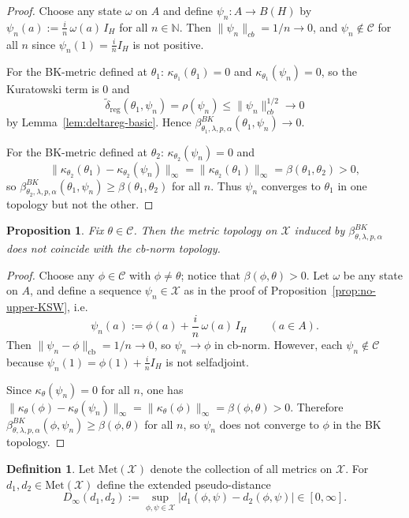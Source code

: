\documentclass[11pt]{amsart}
\newtheorem{proposition}[theorem]{Proposition}
\theoremstyle{definition}
\newtheorem{definition}[theorem]{Definition}
\theoremstyle{remark}
\newcommand{\N}{\mathbb N}
\newcommand{\1}{\mathbbm{1}}
\newcommand{\cb}{\mathrm{cb}}
\begin{document}
\begin{proof}
Choose any state $\omega$ on $A$ and define $\psi_n:A\to B(H)$ by
$\psi_n(a):=\frac{i}{n}\,\omega(a)\,I_H$ for all $n\in\N$.
Then $\|\psi_n\|_{cb}=1/n\to 0$, and $\psi_n\notin \mathcal C$ for all $n$ since $\psi_n(1)=\frac{i}{n}I_H$ is not positive.

For the BK-metric defined at $\theta_1$:
$\kappa_{\theta_1}(\theta_1)=0$ and $\kappa_{\theta_1}(\psi_n)=0$, so the Kuratowski term is $0$ and
\[
\widetilde\delta_{\mathrm{reg}}(\theta_1,\psi_n)=\rho(\psi_n)\le \|\psi_n\|_{cb}^{1/2}\to 0
\]
by Lemma~\ref{lem:deltareg-basic}. Hence $\beta^{BK}_{\theta_1,\lambda,p,\alpha}(\theta_1,\psi_n)\to 0$.

For the BK-metric defined at $\theta_2$:
$\kappa_{\theta_2}(\psi_n)=0$ and
\[
\|\kappa_{\theta_2}(\theta_1)-\kappa_{\theta_2}(\psi_n)\|_\infty=\|\kappa_{\theta_2}(\theta_1)\|_\infty=\beta(\theta_1,\theta_2)>0,
\]
so $\beta^{BK}_{\theta_2,\lambda,p,\alpha}(\theta_1,\psi_n)\ge \beta(\theta_1,\theta_2)$ for all $n$.
Thus $\psi_n$ converges to $\theta_1$ in one topology but not the other.
\end{proof}


\begin{proposition}
\label{prop:no-anchor-cb-topology}
Fix $\theta\in \mathcal C$.
Then the metric topology on $\mathcal X$ induced by $\beta^{BK}_{\theta,\lambda,p,\alpha}$ does not coincide with
the cb-norm topology.
\end{proposition}

\begin{proof}
Choose any $\phi\in \mathcal C$ with $\phi\neq \theta$; notice that $\beta(\phi,\theta)>0$. Let $\omega$ be any state on $A$, and define a sequence $\psi_n\in \mathcal X$ as in the proof of Proposition~\ref{prop:no-upper-KSW}, i.e. 
\[
\psi_n(a):=\phi(a)+\frac{i}{n}\,\omega(a)\,I_H\qquad(a\in A).
\]
Then $\|\psi_n-\phi\|_{\cb}=1/n\to 0$, so $\psi_n\to\phi$ in cb-norm.
However, each $\psi_n\notin \mathcal C$ because $\psi_n(1)=\phi(1)+\frac{i}{n}I_H$ is not selfadjoint.

Since $\kappa_\theta(\psi_n)=0$ for all $n$, one has $\|\kappa_\theta(\phi)-\kappa_\theta(\psi_n)\|_\infty=\|\kappa_\theta(\phi)\|_\infty=\beta(\phi,\theta)>0.$
Therefore $\beta^{BK}_{\theta,\lambda,p,\alpha}(\phi,\psi_n)\ge \beta(\phi,\theta)$ for all $n$, so $\psi_n$ does not converge to $\phi$ in the BK topology.
\end{proof}



\begin{definition}
\label{def:D-infty-metrics}
Let $\mathrm{Met}(\mathcal X)$ denote the collection of all metrics on $\mathcal X$.
For $d_1,d_2\in \mathrm{Met}(\mathcal X)$ define the extended pseudo-distance
\[
D_\infty(d_1,d_2):=\sup_{\phi,\psi\in \mathcal X}\bigl|d_1(\phi,\psi)-d_2(\phi,\psi)\bigr|\in[0,\infty].
\]
\end{definition}
\end{document}

